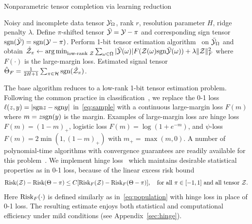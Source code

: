 \documentclass{article}
\theoremstyle{plain}
\theoremstyle{definition}
\def\sign{\textup{sgn}}
\def\risk{\textup{Risk}}
\begin{document}
\vspace{-.2cm}
\begin{algorithm}[h!]
  \caption{Nonparametric tensor completion via learning reduction}\label{alg:tensorT}
 \begin{algorithmic}[1] 
\INPUT Noisy and incomplete data tensor $\mathcal{Y}_\Omega$, rank $r$, resolution parameter $H$, ridge penalty $\lambda$.
\State Define $\pi$-shifted tensor $\bar {\mathcal{Y}}=\mathcal{Y}-\pi$ and corresponding sign tensor $\sign(\bar \tY)=\sign(\tY-\pi)$. 
\State Perform 1-bit tensor estimation algorithm~\citep{ghadermarzy2018learning,wang2018learning,hong2020generalized,alquier2019estimation} on $\bar {\mathcal{Y}}_\Omega$ and obtain $\hat \tZ_\pi\leftarrow \argmin_{\text{low-rank }\tZ}\sum_{\omega\in \Omega} |\bar \tY(\omega)|F(\tZ(\omega)\sign\bar \tY(\omega))+\lambda\FnormSize{}{\tZ}^2$ where $F(\cdot)$ is the large-margin loss.
\EndFor
\OUTPUT Estimated signal tensor $\hat \Theta_F={1\over 2H+1}\sum_{\pi \in \tH}\sign(\hat \tZ_\pi)$.
\vspace{-.1cm}
\end{algorithmic}
\end{algorithm}
\vspace{-.2cm}

The base algorithm reduces to a low-rank 1-bit tensor estimation problem. Following the common practice in classification~\cite{bartlett2006convexity}, we replace the 0-1 loss $\ell(z,y)=|\sign z - \sign y|$ in~\eqref{eq:sample} with a continuous large-margin loss $F(m)$ where $m=z\sign(y)$ is the margin. Examples of large-margin loss are hinge loss $F(m) = (1-m)_+$, logistic loss $F(m) =\log(1+e^{-m})$, and $\psi$-loss $F(m)=2\min(1,(1-m)_+)$ with $m_{+}=\max(m,0)$. A number of polynomial-time algorithms with convergence guarantees are readily available for this problem~\citep{ghadermarzy2018learning,wang2018learning,hong2020generalized,alquier2019estimation}. We implement hinge loss~\cite{alquier2019estimation,genzel2020robust,he2017kernelized} which maintains desirable statistical properties as in 0-1 loss, because of the linear excess risk bound~\cite{scott2011surrogate}
\[
\risk(\tZ)-\risk(\Theta-\pi)\leq C[\risk_F(\tZ)-\risk_F(\Theta-\pi)],\quad \text{for all }\pi\in[-1,1] \text{ and all tensor }\tZ.
\]
Here $\risk_F(\cdot)$ is defined similarly as in~\eqref{eq:population} with hinge loss in place of 0-1 loss. The resulting estimate enjoys both statistical and computational efficiency under mild conditions (see Appendix~\ref{sec:hinge}). 
\end{document}
